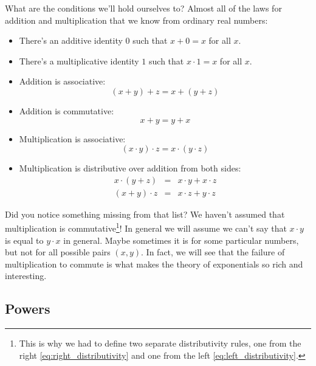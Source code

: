 What are the conditions we'll hold ourselves to? Almost all of the laws for addition and multiplication that we know from ordinary real numbers:

\begin{itemize}
    \item There's an additive identity $0$ such that $x + 0 = x$ for all $x$.
    \item There's a multiplicative identity $1$ such that $x \cdot 1 = x$ for all $x$.
    \item Addition is associative:
        \begin{equation}
            \label{eq:addition_associativity}
            (x + y) + z = x + (y + z)
        \end{equation}
    \item Addition is commutative:
    \begin{equation}
        \label{eq:addition_commutativity}
        x + y = y + x
    \end{equation}
    \item Multiplication is associative:
    \begin{equation}
        \label{eq:multiplication_associativity}
        (x \cdot y) \cdot z = x \cdot (y \cdot z)
    \end{equation}
    \item Multiplication is distributive over addition from both sides:
    \begin{eqnarray}
        \label{eq:right_distributivity}
        x \cdot (y + z) &=& x \cdot y + x \cdot z   \\
        \label{eq:left_distributivity}
        (x + y) \cdot z &=& x \cdot z + y \cdot z
    \end{eqnarray}
\end{itemize}

Did you notice something missing from that list? We haven't assumed that multiplication is commutative\footnote{This is why we had to define two separate distributivity rules, one from the right \eqref{eq:right_distributivity} and one from the left \eqref{eq:left_distributivity}.}! In general we will assume we can't say that $x \cdot y$ is equal to $y \cdot x$ in general. Maybe sometimes it is for some particular numbers, but not for all possible pairs $(x, y)$. In fact, we will see that the failure of multiplication to commute is what makes the theory of exponentials so rich and interesting.

\subsection{Powers}

